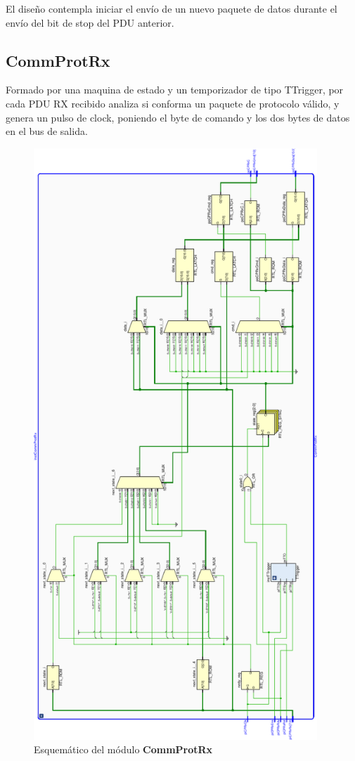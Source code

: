 \documentclass[12pt]{article}
\begin{document}
El diseño contempla iniciar el envío de un nuevo paquete de datos durante el envío del bit de stop del PDU anterior.

\subsection{CommProtRx}
Formado por una maquina de estado y un temporizador de tipo TTrigger, por cada PDU RX recibido analiza si conforma un paquete de protocolo válido, y genera un pulso de clock, poniendo el byte de comando y los dos bytes de datos en el bus de salida.

\begin{figure}[H]
    \centering
    \includegraphics[angle=270, width=0.95\textwidth]{CommProtRx-crop}
    \caption{Esquemático del módulo \textbf{CommProtRx}}
\end{figure}
\end{document}
